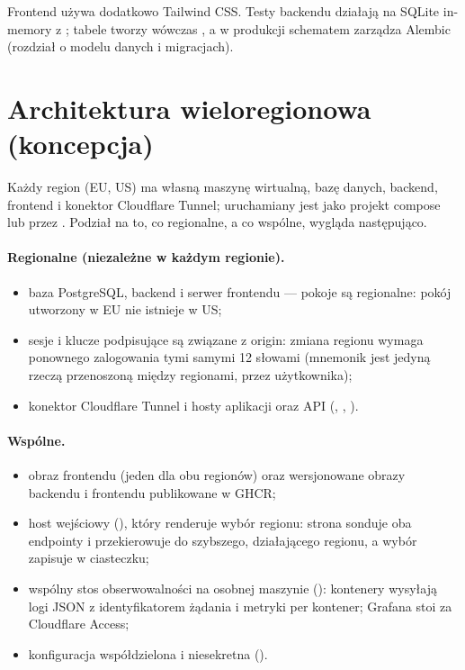 Frontend używa dodatkowo Tailwind CSS. Testy backendu działają na SQLite in-memory z
; tabele tworzy wówczas , a w produkcji
schematem zarządza Alembic (rozdział o modelu danych i migracjach).

\section{Architektura wieloregionowa (koncepcja)}
\label{sec:arch-regiony}

Każdy region (EU, US) ma własną maszynę wirtualną, bazę danych, backend, frontend i
konektor Cloudflare Tunnel; uruchamiany jest jako projekt compose 
lub  przez . Podział na to, co regionalne, a co
wspólne, wygląda następująco.

\paragraph{Regionalne (niezależne w każdym regionie).}
\begin{itemize}
  \item baza PostgreSQL, backend i serwer frontendu --- pokoje są regionalne: pokój
        utworzony w EU nie istnieje w US;
  \item sesje i klucze podpisujące są związane z origin: zmiana regionu wymaga ponownego
        zalogowania tymi samymi 12 słowami (mnemonik jest jedyną rzeczą przenoszoną między
        regionami, przez użytkownika);
  \item konektor Cloudflare Tunnel i hosty aplikacji oraz API
        (, ,
        ).
\end{itemize}

\paragraph{Wspólne.}
\begin{itemize}
  \item obraz frontendu (jeden dla obu regionów) oraz wersjonowane obrazy backendu i
        frontendu publikowane w GHCR;
  \item host wejściowy (), który renderuje wybór regionu: strona
        sonduje oba endpointy  i przekierowuje do szybszego, działającego
        regionu, a wybór zapisuje w ciasteczku;
  \item wspólny stos obserwowalności na osobnej maszynie (): kontenery
        wysyłają logi JSON z identyfikatorem żądania i metryki per kontener; Grafana stoi
        za Cloudflare Access;
  \item konfiguracja współdzielona i niesekretna ().
\end{itemize}

